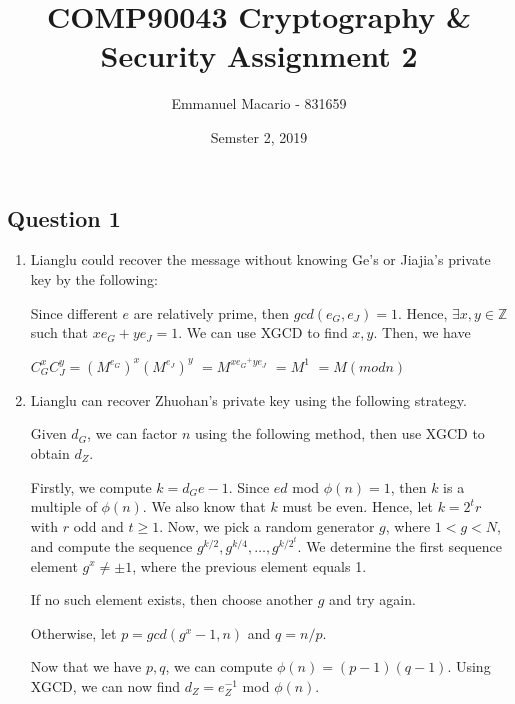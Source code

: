 \documentclass[12pt]{article}
\author{Emmanuel Macario - 831659}
\title{COMP90043 Cryptography \& Security Assignment 2}
\date{Semster 2, 2019}
\begin{document}
\maketitle

\subsection*{Question 1}

\begin{enumerate}
\item Lianglu could recover the message without knowing Ge's or Jiajia's private key by the following:

Since different $e$ are relatively prime, then $gcd(e_{G}, e_{J})=1$. Hence, $\exists x, y \in \mathbb{Z}$ such 
that $xe_{G}+ye_{J}=1$. We can use XGCD to find $x, y$. Then, we have


\begin{center}
$C_{G}^{x} C_{J}^{y} = (M^{e_{G}})^{x} (M^{e_{J}})^{y}$
$                                  =  M^{{x e_{G}}^+{y e_{J}}}$
$                                  = M^{1}$
$                                  = M (mod n)$

\end{center}

\item Lianglu can recover Zhuohan's private key using the following strategy.

Given $d_{G}$, we can factor $n$ using the following method, then use XGCD to obtain $d_{Z}$.

Firstly, we compute $k=d_{G}e - 1$. Since $ed$ mod $\phi (n) = 1$, then $k$ is a multiple of $\phi (n)$. 
We also know that $k$ must be even. Hence, let $k=2^{t}r$ with $r$ odd and $t \geq 1$. Now, we pick a random
generator $g$, where $1 < g < N$, and compute the sequence $g^{k/2}, g^{k/4}, \dots, g^{k/2^{t}}$. We determine
the first sequence element $g^{x} \neq \pm 1$, where the previous element equals {1}.

If no such element exists, then choose another $g$ and try again.

Otherwise, let $p = gcd(g^{x}-1, n)$ and $q = n/p$.


Now that we have $p, q$, we can compute $\phi (n) = (p-1)(q-1)$. Using XGCD, we can now find
$d_{Z} = e_{Z}^{-1}$ mod $\phi (n)$.


\end{enumerate}


\end{document}
